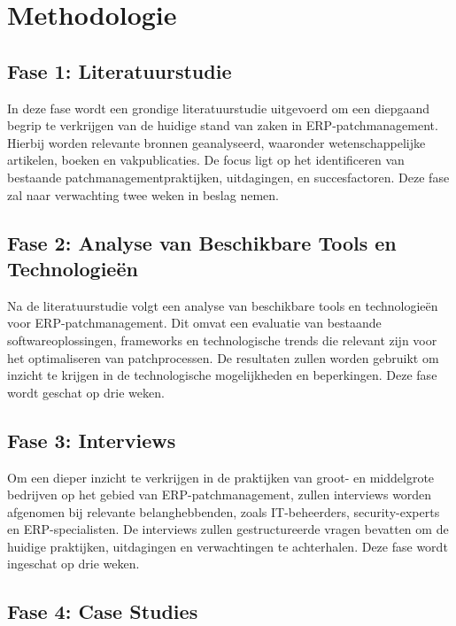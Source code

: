 \section{Methodologie}%
\label{sec:methodologie}

\subsection{Fase 1: Literatuurstudie}

In deze fase wordt een grondige literatuurstudie uitgevoerd om een diepgaand begrip te verkrijgen van de huidige stand van zaken in ERP-patchmanagement. Hierbij worden relevante bronnen geanalyseerd, waaronder wetenschappelijke artikelen, boeken en vakpublicaties. De focus ligt op het identificeren van bestaande patchmanagementpraktijken, uitdagingen, en succesfactoren. Deze fase zal naar verwachting twee weken in beslag nemen.

\subsection{Fase 2: Analyse van Beschikbare Tools en Technologieën}

Na de literatuurstudie volgt een analyse van beschikbare tools en technologieën voor ERP-patchmanagement. Dit omvat een evaluatie van bestaande softwareoplossingen, frameworks en technologische trends die relevant zijn voor het optimaliseren van patchprocessen. De resultaten zullen worden gebruikt om inzicht te krijgen in de technologische mogelijkheden en beperkingen. Deze fase wordt geschat op drie weken.

\subsection{Fase 3: Interviews}

Om een dieper inzicht te verkrijgen in de praktijken van groot- en middelgrote bedrijven op het gebied van ERP-patchmanagement, zullen interviews worden afgenomen bij relevante belanghebbenden, zoals IT-beheerders, security-experts en ERP-specialisten. De interviews zullen gestructureerde vragen bevatten om de huidige praktijken, uitdagingen en verwachtingen te achterhalen. Deze fase wordt ingeschat op drie weken.

\subsection{Fase 4: Case Studies}

